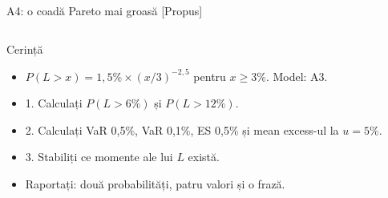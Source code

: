 \begin{frame}{A4: o coadă Pareto mai groasă [Propus]}
\propsub
\itemsize{\scriptsize}
\begin{columns}[T]
\begin{column}{\taskw}
\begin{block}{Cerință}
\begin{itemize}
    \item $P(L > x) = 1{,}5\% \times (x/3)^{-2{,}5}$ pentru $x \ge 3\%$. Model: A3.
    \item 1. Calculați $P(L > 6\%)$ și $P(L > 12\%)$.
    \item 2. Calculați VaR 0,5\%, VaR 0,1\%, ES 0,5\% și mean excess-ul la $u = 5\%$.
    \item 3. Stabiliți ce momente ale lui $L$ există.
    \item Raportați: două probabilități, patru valori și o frază.
\end{itemize}
\end{block}
\end{column}
\begin{column}{\solw}
\end{column}
\end{columns}
\end{frame}

